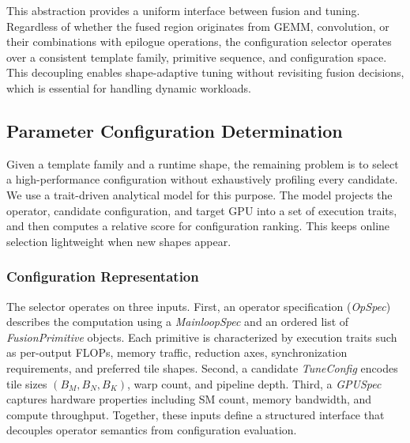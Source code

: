 This abstraction provides a uniform interface between fusion and tuning. 
Regardless of whether the fused region originates from GEMM, convolution, 
or their combinations with epilogue operations, the configuration selector 
operates over a consistent template family, primitive sequence, and 
configuration space. This decoupling enables shape-adaptive tuning without 
revisiting fusion decisions, which is essential for handling dynamic workloads.


\subsection{Parameter Configuration Determination}
\label{sec:determination}

Given a template family and a runtime shape, the remaining problem is to select
a high-performance configuration without exhaustively profiling every
candidate.  We use a trait-driven analytical model for this purpose.  The model
projects the operator, candidate configuration, and target GPU into a set of execution
traits, and then computes a relative score for configuration ranking.  This
keeps online selection lightweight when new shapes appear.

\subsubsection{Configuration Representation}
The selector operates on three inputs. First, an operator specification
(\textit{OpSpec}) describes the computation using a \textit{MainloopSpec}
and an ordered list of \textit{FusionPrimitive} objects. Each primitive
is characterized by execution traits such as per-output FLOPs, memory
traffic, reduction axes, synchronization requirements, and preferred
tile shapes. 
Second, a candidate \textit{TuneConfig} encodes tile sizes
$(B_M,B_N,B_K)$, warp count, and pipeline depth. Third, a
\textit{GPUSpec} captures hardware properties including SM count,
memory bandwidth, and compute throughput. Together, these inputs define
a structured interface that decouples operator semantics from
configuration evaluation.

